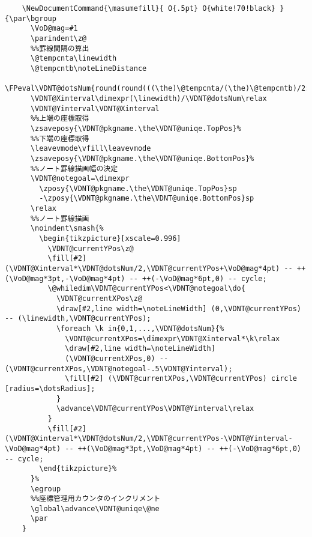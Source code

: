 \documentclass[a4paper,12pt]{article}
\begin{document}
\begin{lstlisting}
    \NewDocumentCommand{\masumefill}{ O{.5pt} O{white!70!black} }{\par\bgroup
      \VoD@mag=#1
      \parindent\z@
      %%罫線間隔の算出
      \@tempcnta\linewidth
      \@tempcntb\noteLineDistance
      \FPeval\VDNT@dotsNum{round(round(((\the)\@tempcnta/(\the)\@tempcntb)/2:0)*2:0)}%
      \VDNT@Xinterval\dimexpr(\linewidth)/\VDNT@dotsNum\relax
      \VDNT@Yinterval\VDNT@Xinterval
      %%上端の座標取得
      \zsaveposy{\VDNT@pkgname.\the\VDNT@uniqe.TopPos}%
      %%下端の座標取得
      \leavevmode\vfill\leavevmode
      \zsaveposy{\VDNT@pkgname.\the\VDNT@uniqe.BottomPos}%
      %%ノート罫線描画幅の決定
      \VDNT@notegoal=\dimexpr
        \zposy{\VDNT@pkgname.\the\VDNT@uniqe.TopPos}sp
        -\zposy{\VDNT@pkgname.\the\VDNT@uniqe.BottomPos}sp
      \relax
      %%ノート罫線描画
      \noindent\smash{%
        \begin{tikzpicture}[xscale=0.996]
          \VDNT@currentYPos\z@
          \fill[#2] (\VDNT@Xinterval*\VDNT@dotsNum/2,\VDNT@currentYPos+\VoD@mag*4pt) -- ++(\VoD@mag*3pt,-\VoD@mag*4pt) -- ++(-\VoD@mag*6pt,0) -- cycle;
          \@whiledim\VDNT@currentYPos<\VDNT@notegoal\do{
            \VDNT@currentXPos\z@
            \draw[#2,line width=\noteLineWidth] (0,\VDNT@currentYPos) -- (\linewidth,\VDNT@currentYPos);
            \foreach \k in{0,1,...,\VDNT@dotsNum}{%
              \VDNT@currentXPos=\dimexpr\VDNT@Xinterval*\k\relax
              \draw[#2,line width=\noteLineWidth]
              (\VDNT@currentXPos,0) -- (\VDNT@currentXPos,\VDNT@notegoal-.5\VDNT@Yinterval);
              \fill[#2] (\VDNT@currentXPos,\VDNT@currentYPos) circle [radius=\dotsRadius];
            }
            \advance\VDNT@currentYPos\VDNT@Yinterval\relax
          }
          \fill[#2] (\VDNT@Xinterval*\VDNT@dotsNum/2,\VDNT@currentYPos-\VDNT@Yinterval-\VoD@mag*4pt) -- ++(\VoD@mag*3pt,\VoD@mag*4pt) -- ++(-\VoD@mag*6pt,0) -- cycle;
        \end{tikzpicture}%
      }%
      \egroup
      %%座標管理用カウンタのインクリメント
      \global\advance\VDNT@uniqe\@ne
      \par
    }



\end{lstlisting}
\end{document}
